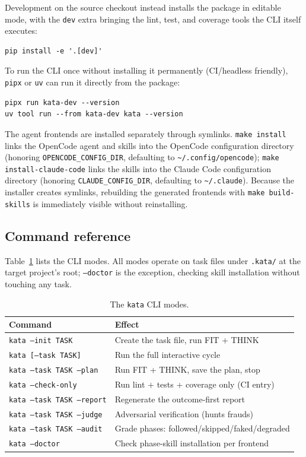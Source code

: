 \documentclass[11pt]{article}
\begin{document}
Development on the source checkout instead installs the package in
editable mode, with the \texttt{dev} extra bringing the lint, test, and
coverage tools the CLI itself executes:

\begin{lstlisting}
pip install -e '.[dev]'
\end{lstlisting}

To run the CLI once without installing it permanently (CI/headless
friendly), \texttt{pipx} or \texttt{uv} can run it directly from the
package:

\begin{lstlisting}
pipx run kata-dev --version
uv tool run --from kata-dev kata --version
\end{lstlisting}

The agent frontends are installed separately through symlinks. \texttt{make
install} links the OpenCode agent and skills into the OpenCode
configuration directory (honoring \texttt{OPENCODE\_CONFIG\_DIR}, defaulting
to \texttt{\~{}/.config/opencode}); \texttt{make install-claude-code} links
the skills into the Claude Code configuration directory (honoring
\texttt{CLAUDE\_CONFIG\_DIR}, defaulting to \texttt{\~{}/.claude}).
Because the installer creates symlinks, rebuilding the generated frontends
with \texttt{make build-skills} is immediately visible without
reinstalling.

\subsection{Command reference}

Table~\ref{tab:cli} lists the CLI modes. All modes operate on task files
under \texttt{.kata/} at the target project's root; \texttt{--doctor} is
the exception, checking skill installation without touching any task.

\begin{table}[!ht]
\caption{The \texttt{kata} CLI modes.}
\centering
\footnotesize
\begin{tabular}{@{}ll@{}}
\toprule
Command & Effect \\
\midrule
\texttt{kata --init TASK} & Create the task file, run FIT + THINK \\
\texttt{kata [--task TASK]} & Run the full interactive cycle \\
\texttt{kata --task TASK --plan} & Run FIT + THINK, save the plan, stop \\
\texttt{kata --check-only} & Run lint + tests + coverage only (CI entry) \\
\texttt{kata --task TASK --report} & Regenerate the outcome-first report \\
\texttt{kata --task TASK --judge} & Adversarial verification (hunts frauds) \\
\texttt{kata --task TASK --audit} & Grade phases: followed/skipped/faked/degraded \\
\texttt{kata --doctor} & Check phase-skill installation per frontend \\
\bottomrule
\end{tabular}
\label{tab:cli}
\end{table}
\end{document}
